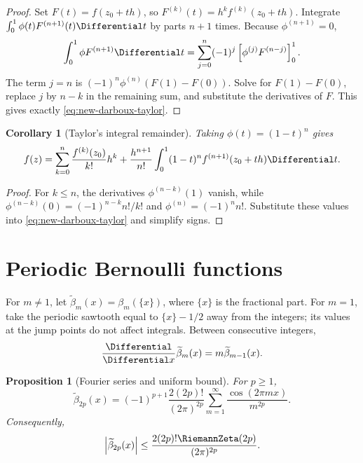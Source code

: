 \documentclass[11pt,a4paper,oneside,openany]{book}
\newtheorem{proposition}[theorem]{Proposition}
\newtheorem{corollary}[theorem]{Corollary}
\theoremstyle{definition}
\theoremstyle{remark}
\begin{document}
\begin{proof}
Set $F(t)=f(z_0+th)$, so $F^{(k)}(t)=h^kf^{(k)}(z_0+th)$.  Integrate
$\int_0^1\phi(t)F^{(n+1)}(t)\Differential t$ by parts $n+1$ times.  Because
$\phi^{(n+1)}=0$,
\[
 \int_0^1\phi F^{(n+1)}\Differential t
 =\sum_{j=0}^{n}(-1)^j
 \left[\phi^{(j)}F^{(n-j)}\right]_{0}^{1}.
\]
The term $j=n$ is
$(-1)^n\phi^{(n)}(F(1)-F(0))$.  Solve for $F(1)-F(0)$, replace
$j$ by $n-k$ in the remaining sum, and substitute the derivatives of $F$.
This gives exactly \eqref{eq:new-darboux-taylor}.
\end{proof}

\begin{corollary}[Taylor's integral remainder]\label{cor:new-taylor-remainder}
Taking $\phi(t)=(1-t)^n$ gives
\begin{equation}\label{eq:new-taylor-remainder}
 f(z)=\sum_{k=0}^{n}\frac{f^{(k)}(z_0)}{k!}h^k
 +\frac{h^{n+1}}{n!}\int_0^1(1-t)^n
 f^{(n+1)}(z_0+th)\Differential t.
\end{equation}
\end{corollary}

\begin{proof}
For $k\le n$, the derivatives $\phi^{(n-k)}(1)$ vanish, while
$\phi^{(n-k)}(0)=(-1)^{n-k}n!/k!$ and
$\phi^{(n)}=(-1)^nn!$.  Substitute these values into
\eqref{eq:new-darboux-taylor} and simplify signs.
\end{proof}

\section{Periodic Bernoulli functions}

For $m\ne1$, let $\widetilde\beta_m(x)=\beta_m(\{x\})$, where $\{x\}$ is
the fractional part.  For $m=1$, take the periodic sawtooth equal to
$\{x\}-1/2$ away from the integers; its values at the jump points do not
affect integrals.  Between consecutive integers,
\begin{equation}\label{eq:new-periodic-bernoulli-derivative}
 \frac{\Differential}{\Differential x}\widetilde\beta_m(x)
 =m\widetilde\beta_{m-1}(x).
\end{equation}

\begin{proposition}[Fourier series and uniform bound]\label{prop:new-periodic-bernoulli-fourier}
For $p\ge1$,
\begin{equation}\label{eq:new-periodic-bernoulli-fourier}
 \widetilde\beta_{2p}(x)
 =(-1)^{p+1}\frac{2(2p)!}{(2\pi)^{2p}}
 \sum_{m=1}^{\infty}\frac{\cos(2\pi mx)}{m^{2p}}.
\end{equation}
Consequently,
\begin{equation}\label{eq:new-periodic-bernoulli-bound}
 \left|\widetilde\beta_{2p}(x)\right|
 \le\frac{2(2p)!\RiemannZeta(2p)}{(2\pi)^{2p}}.
\end{equation}
\end{proposition}
\end{document}
